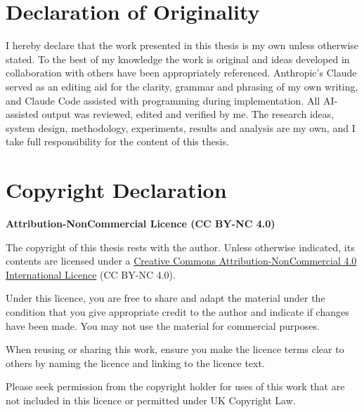 \cleardoublepage{}
{}\mtcaddchapter 
\chapter*{Declaration of Originality}
\addtocounter{counter}{-1}




I hereby declare that the work presented in this thesis is my own unless otherwise stated. To the best of my knowledge the work is original and ideas developed in collaboration with others have been appropriately referenced. Anthropic's Claude served as an editing aid for the clarity, grammar and phrasing of my own writing, and Claude Code assisted with programming during implementation. All AI-assisted output was reviewed, edited and verified by me. The research ideas, system design, methodology, experiments, results and analysis are my own, and I take full responsibility for the content of this thesis.


\cleardoublepage{}
{}\mtcaddchapter 
\chapter*{Copyright Declaration}
\addtocounter{counter}{-1}


\textbf{Attribution-NonCommercial Licence (CC BY-NC 4.0)}

The copyright of this thesis rests with the author. Unless otherwise indicated, its contents are licensed under a \href{https://creativecommons.org/licenses/by-nc/4.0/}{Creative Commons Attribution-NonCommercial 4.0 International Licence} (CC BY-NC 4.0).

Under this licence, you are free to share and adapt the material under the condition that you give appropriate credit to the author and indicate if changes have been made. You may not use the material for commercial purposes.

When reusing or sharing this work, ensure you make the licence terms clear to others by naming the licence and linking to the licence text.

Please seek permission from the copyright holder for uses of this work that are not included in this licence or permitted under UK Copyright Law.
